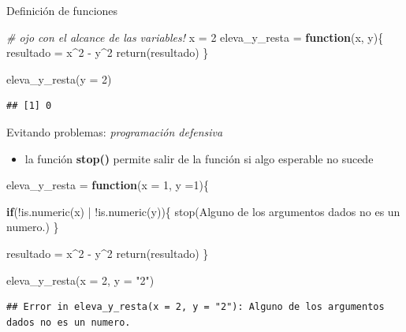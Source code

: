 \documentclass[
  ignorenonframetext,
]{beamer}
\newenvironment{Shaded}{\begin{snugshade}}{\end{snugshade}}
\newcommand{\AttributeTok}[1]{\textcolor[rgb]{0.77,0.63,0.00}{#1}}
\newcommand{\CommentTok}[1]{\textcolor[rgb]{0.56,0.35,0.01}{\textit{#1}}}
\newcommand{\ControlFlowTok}[1]{\textcolor[rgb]{0.13,0.29,0.53}{\textbf{#1}}}
\newcommand{\DecValTok}[1]{\textcolor[rgb]{0.00,0.00,0.81}{#1}}
\newcommand{\FunctionTok}[1]{\textcolor[rgb]{0.00,0.00,0.00}{#1}}
\newcommand{\NormalTok}[1]{#1}
\newcommand{\OtherTok}[1]{\textcolor[rgb]{0.56,0.35,0.01}{#1}}
\newcommand{\SpecialCharTok}[1]{\textcolor[rgb]{0.00,0.00,0.00}{#1}}
\newcommand{\StringTok}[1]{\textcolor[rgb]{0.31,0.60,0.02}{#1}}
\providecommand{\tightlist}{%
  \setlength{\itemsep}{0pt}\setlength{\parskip}{0pt}}
\begin{document}
\begin{frame}[fragile]{Definición de funciones}
\protect\hypertarget{definiciuxf3n-de-funciones-6}{}
\begin{Shaded}
\begin{Highlighting}[]
\CommentTok{\# ojo con el alcance de las variables!}
\NormalTok{x }\OtherTok{=} \DecValTok{2}
\NormalTok{eleva\_y\_resta }\OtherTok{=} \ControlFlowTok{function}\NormalTok{(x, y)\{}
\NormalTok{  resultado }\OtherTok{=}\NormalTok{ x}\SpecialCharTok{\^{}}\DecValTok{2} \SpecialCharTok{{-}}\NormalTok{ y}\SpecialCharTok{\^{}}\DecValTok{2}
  \FunctionTok{return}\NormalTok{(resultado)}
\NormalTok{\}}

\FunctionTok{eleva\_y\_resta}\NormalTok{(}\AttributeTok{y =} \DecValTok{2}\NormalTok{)}
\end{Highlighting}
\end{Shaded}

\begin{verbatim}
## [1] 0
\end{verbatim}
\end{frame}

\begin{frame}[fragile]{Evitando problemas: \emph{programación
defensiva}}
\protect\hypertarget{evitando-problemas-programaciuxf3n-defensiva}{}
\begin{itemize}
\tightlist
\item
  la función \textbf{stop()} permite salir de la función si algo
  esperable no sucede
\end{itemize}

\small

\begin{Shaded}
\begin{Highlighting}[]
\NormalTok{eleva\_y\_resta }\OtherTok{=} \ControlFlowTok{function}\NormalTok{(}\AttributeTok{x =} \DecValTok{1}\NormalTok{, }\AttributeTok{y =}\DecValTok{1}\NormalTok{)\{}
  
  \ControlFlowTok{if}\NormalTok{(}\SpecialCharTok{!}\FunctionTok{is.numeric}\NormalTok{(x) }\SpecialCharTok{|} \SpecialCharTok{!}\FunctionTok{is.numeric}\NormalTok{(y))\{}
    \FunctionTok{stop}\NormalTok{(}\StringTok{\textquotesingle{}Alguno de los argumentos dados no es un numero.\textquotesingle{}}\NormalTok{)}
\NormalTok{  \}}
  
\NormalTok{  resultado }\OtherTok{=}\NormalTok{ x}\SpecialCharTok{\^{}}\DecValTok{2} \SpecialCharTok{{-}}\NormalTok{ y}\SpecialCharTok{\^{}}\DecValTok{2}
  \FunctionTok{return}\NormalTok{(resultado)}
\NormalTok{\}}

\FunctionTok{eleva\_y\_resta}\NormalTok{(}\AttributeTok{x =} \DecValTok{2}\NormalTok{, }\AttributeTok{y =} \StringTok{"2"}\NormalTok{)}
\end{Highlighting}
\end{Shaded}

\begin{verbatim}
## Error in eleva_y_resta(x = 2, y = "2"): Alguno de los argumentos dados no es un numero.
\end{verbatim}

\normalsize
\end{frame}
\end{document}
